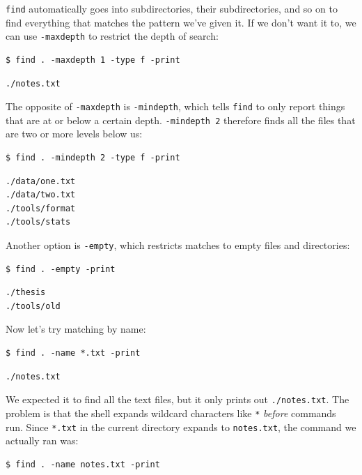 \documentclass[]{book}
\begin{document}
\texttt{find} automatically goes into subdirectories, their
subdirectories, and so on to find everything that matches the pattern
we've given it. If we don't want it to, we can use \texttt{-maxdepth} to
restrict the depth of search:

\begin{verbatim}
$ find . -maxdepth 1 -type f -print
\end{verbatim}

\begin{verbatim}
./notes.txt
\end{verbatim}

The opposite of \texttt{-maxdepth} is \texttt{-mindepth}, which tells
\texttt{find} to only report things that are at or below a certain
depth. \texttt{-mindepth 2} therefore finds all the files that are two
or more levels below us:

\begin{verbatim}
$ find . -mindepth 2 -type f -print
\end{verbatim}

\begin{verbatim}
./data/one.txt
./data/two.txt
./tools/format
./tools/stats
\end{verbatim}

Another option is \texttt{-empty}, which restricts matches to empty
files and directories:

\begin{verbatim}
$ find . -empty -print
\end{verbatim}

\begin{verbatim}
./thesis
./tools/old
\end{verbatim}

Now let's try matching by name:

\begin{verbatim}
$ find . -name *.txt -print
\end{verbatim}

\begin{verbatim}
./notes.txt
\end{verbatim}

We expected it to find all the text files, but it only prints out
\texttt{./notes.txt}. The problem is that the shell expands wildcard
characters like \texttt{*} \emph{before} commands run. Since
\texttt{*.txt} in the current directory expands to \texttt{notes.txt},
the command we actually ran was:

\begin{verbatim}
$ find . -name notes.txt -print
\end{verbatim}
\end{document}
